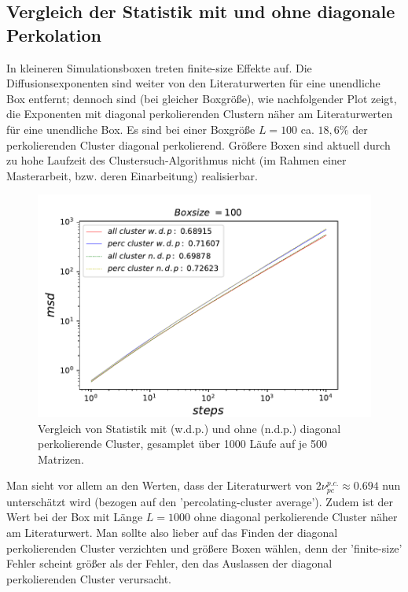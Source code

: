 \documentclass[a4paper, 12pt]{report}
\begin{document}
\subsection{Vergleich der Statistik mit und ohne diagonale Perkolation}
\noindent In kleineren Simulationsboxen treten finite-size Effekte auf. Die Diffusionsexponenten sind weiter von den Literaturwerten für eine unendliche Box entfernt; dennoch sind (bei gleicher Boxgröße), wie nachfolgender Plot zeigt, die Exponenten mit diagonal perkolierenden Clustern näher am Literaturwerten für eine unendliche Box. Es sind bei einer Boxgröße $L=100$ ca. $18,6\%$ der perkolierenden Cluster diagonal perkolierend. Größere Boxen sind aktuell durch zu hohe Laufzeit des Clustersuch-Algorithmus nicht (im Rahmen einer Masterarbeit, bzw. deren Einarbeitung) realisierbar.
\begin{figure}[h!]
	\centering
	\includegraphics[scale=0.9]{both100.pdf}
	\caption{Vergleich von Statistik mit (w.d.p.) und ohne (n.d.p.) diagonal perkolierende Cluster, gesamplet über 1000 Läufe auf je 500 Matrizen.}
\end{figure}

\noindent Man sieht vor allem an den Werten, dass der Literaturwert von $2\nu_{pc}^{p.c.} \approx 0.694$ nun unterschätzt wird (bezogen auf den 'percolating-cluster average'). Zudem ist der Wert bei der Box mit Länge $L=1000$ ohne diagonal perkolierende Cluster näher am Literaturwert. Man sollte also lieber auf das Finden der diagonal perkolierenden Cluster verzichten und größere Boxen wählen, denn der 'finite-size' Fehler scheint größer als der Fehler, den das Auslassen der diagonal perkolierenden Cluster verursacht.
\end{document}
